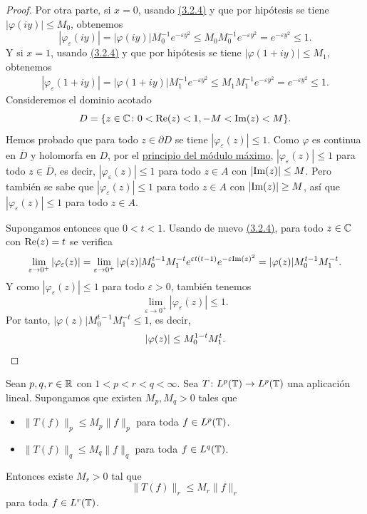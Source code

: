 \documentclass[a4paper, 12pt, oneside]{book}
\begin{document}
\begin{proof}
    Por otra parte, si $x = 0$, usando \hyperref[3.2.4]{\color{blue}(3.2.4)} y que por hipótesis se tiene $|\varphi(iy)| \leq M_0$, obtenemos
    \[|\varphi_\varepsilon(iy)| = |\varphi(iy)|M_0^{-1}e^{-\varepsilon y^2} \leq M_0M_0^{-1}e^{-\varepsilon y^2} = e^{-\varepsilon y^2} \leq 1.\]
    Y si $x = 1$, usando \hyperref[3.2.4]{\color{blue}(3.2.4)} y que por hipótesis se tiene $|\varphi(1+iy)| \leq M_1$, obtenemos
    \begin{align*}
        |\varphi_\varepsilon(1+iy)| = |\varphi(1+iy)|M_1^{-1}e^{-\varepsilon y^2} \leq M_1M_1^{-1}e^{-\varepsilon y^2} = e^{-\varepsilon y^2} \leq 1.
    \end{align*}
    Consideremos el dominio acotado 
    \[D = \{z \in \mathbb C \colon 0 < \textup{Re}(z) < 1, -M < \textup{Im}(z) < M\}.\]
    Hemos probado que para todo $z \in \partial D$ se tiene $|\varphi_\varepsilon(z)| \leq 1$. Como $\varphi$ es continua en $\overline{D}$ y holomorfa en $D$, por el \hyperref[1.2.12]{\color{blue}principio del módulo máximo}, $|\varphi_\varepsilon(z)| \leq 1$ para todo $z \in \overline{D}$, es decir, $|\varphi_\varepsilon(z)| \leq 1$ para todo $z \in A$ con $|\textup{Im}(z)| \leq M$. Pero también se sabe que $|\varphi_\varepsilon(z)| \leq 1$ para todo $z \in A$ con $|\textup{Im}(z)| \geq M$, así que $|\varphi_\varepsilon(z)| \leq 1$ para todo $z \in A$.

    Supongamos entonces que $0 < t < 1$. Usando de nuevo \hyperref[3.2.4]{\color{blue}(3.2.4)}, para todo $z \in \mathbb C$ con $\textup{Re}(z) = t$ se verifica
    \[\lim_{\varepsilon \to 0^+} |\varphi_\varepsilon(z)| = \lim_{\varepsilon \to 0^+}  |\varphi(z)|M_0^{t-1}M_1^{-t}e^{\varepsilon t(t-1)}e^{-\varepsilon \textup{Im}(z)^2} = |\varphi(z)|M_0^{t-1}M_1^{-t}.\]
    Y como $|\varphi_\varepsilon(z)| \leq 1$ para todo $\varepsilon > 0$, también tenemos
    \[\lim_{\varepsilon \to 0^+} |\varphi_\varepsilon(z)| \leq 1.\]
    Por tanto, $|\varphi(z)| M_0^{t-1}M_1^{-t} \leq 1$, es decir,
    \[|\varphi(z)| \leq M_0^{1-t}M_1^t. \qedhere\]
\end{proof}

\begin{theorem}\label{3.2.5}
    Sean $p,q,r\in{\mathbb R}$ con $1 < p < r < q < \infty$. Sea $T \colon L^{p}(\mathbb T) \to L^{p}(\mathbb T)$ una aplicación lineal. Supongamos que existen $M_p,M_q>0$ tales que
    \begin{itemize}
        \item $\|T(f)\|_{p} \leq M_p\|f\|_{p}$ para toda $f \in L^{p}(\mathbb T)$.
        \item $\|T(f)\|_{q} \leq M_q\|f\|_{q}$ para toda $f \in L^{q}(\mathbb T)$.
    \end{itemize}
    Entonces existe $M_r>0$ tal que
    \[\|T(f)\|_r \leq M_r\|f\|_r\]
    para toda $f \in L^r(\mathbb T)$.
\end{theorem}
\end{document}
